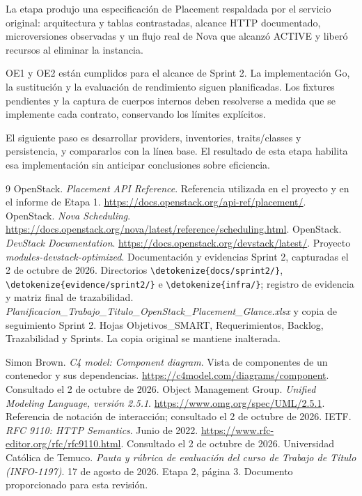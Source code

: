 \documentclass[12pt,a4paper]{article}
\newcommand{\code}[1]{{\small\expandafter\nolinkurl\expandafter{\detokenize{#1}}}}
\begin{document}
La etapa produjo una especificación de Placement respaldada por el servicio original: arquitectura y tablas contrastadas, alcance HTTP documentado, microversiones observadas y un flujo real de Nova que alcanzó ACTIVE y liberó recursos al eliminar la instancia.

OE1 y OE2 están cumplidos para el alcance de Sprint 2. La implementación Go, la sustitución y la evaluación de rendimiento siguen planificadas. Los fixtures pendientes y la captura de cuerpos internos deben resolverse a medida que se implemente cada contrato, conservando los límites explícitos.

El siguiente paso es desarrollar providers, inventories, traits/classes y persistencia, y compararlos con la línea base. El resultado de esta etapa habilita esa implementación sin anticipar conclusiones sobre eficiencia.

\Needspace{280pt}
\begingroup\small
{}
\begin{thebibliography}{9}
 OpenStack. \textit{Placement API Reference}. Referencia utilizada en el proyecto y en el informe de Etapa 1. \url{https://docs.openstack.org/api-ref/placement/}.
 OpenStack. \textit{Nova Scheduling}. \url{https://docs.openstack.org/nova/latest/reference/scheduling.html}.
 OpenStack. \textit{DevStack Documentation}. \url{https://docs.openstack.org/devstack/latest/}.
 Proyecto \textit{modules-devstack-optimized}. Documentación y evidencias Sprint 2, capturadas el 2 de octubre de 2026. Directorios \code{docs/sprint2/}, \code{evidence/sprint2/} e \code{infra/}; registro de evidencia y matriz final de trazabilidad.
 \textit{Planificacion\_Trabajo\_Titulo\_OpenStack\_Placement\_Glance.xlsx} y copia de seguimiento Sprint 2. Hojas Objetivos\_SMART, Requerimientos, Backlog, Trazabilidad y Sprints. La copia original se mantiene inalterada.

 Simon Brown. \textit{C4 model: Component diagram}. Vista de componentes de un contenedor y sus dependencias. \url{https://c4model.com/diagrams/component}. Consultado el 2 de octubre de 2026.
 Object Management Group. \textit{Unified Modeling Language, versión 2.5.1}. \url{https://www.omg.org/spec/UML/2.5.1}. Referencia de notación de interacción; consultado el 2 de octubre de 2026.
 IETF. \textit{RFC 9110: HTTP Semantics}. Junio de 2022. \url{https://www.rfc-editor.org/rfc/rfc9110.html}. Consultado el 2 de octubre de 2026.
 Universidad Católica de Temuco. \textit{Pauta y rúbrica de evaluación del curso de Trabajo de Título (INFO-1197)}. 17 de agosto de 2026. Etapa 2, página 3. Documento proporcionado para esta revisión.
\end{thebibliography}
\endgroup
\end{document}
